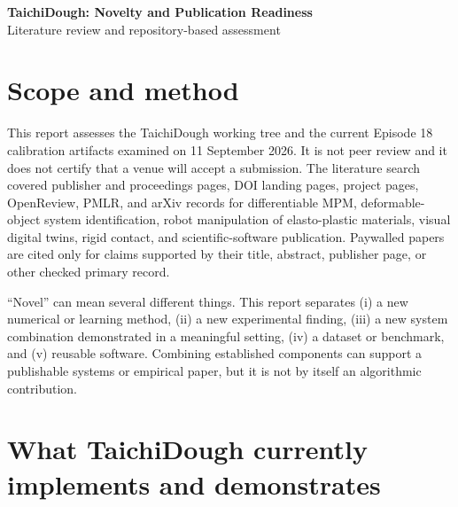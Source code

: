 \documentclass[11pt]{article}
\begin{document}
\begin{center}
{\LARGE\bfseries TaichiDough: Novelty and Publication Readiness}\\[0.45em]
{\large Literature review and repository-based assessment}\\[0.9em]
\end{center}

\section*{Scope and method}

This report assesses the TaichiDough working tree and the current Episode 18 calibration artifacts examined on 11 September 2026. It is not peer review and it does not certify that a venue will accept a submission. The literature search covered publisher and proceedings pages, DOI landing pages, project pages, OpenReview, PMLR, and arXiv records for differentiable MPM, deformable-object system identification, robot manipulation of elasto-plastic materials, visual digital twins, rigid contact, and scientific-software publication. Paywalled papers are cited only for claims supported by their title, abstract, publisher page, or other checked primary record.

``Novel'' can mean several different things. This report separates (i) a new numerical or learning method, (ii) a new experimental finding, (iii) a new system combination demonstrated in a meaningful setting, (iv) a dataset or benchmark, and (v) reusable software. Combining established components can support a publishable systems or empirical paper, but it is not by itself an algorithmic contribution.

\section{What TaichiDough currently implements and demonstrates}
\end{document}
